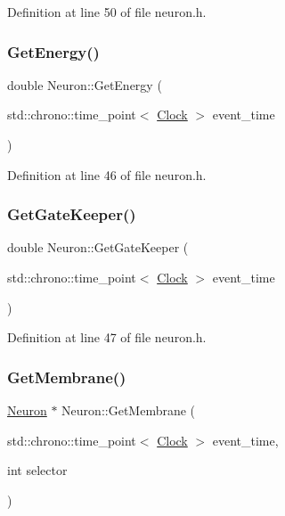Definition at line 50 of file neuron.\+h.

\mbox{\label{class_neuron_a91dd5325856e246d98c2864e1c955972}} 
\subsubsection{\texorpdfstring{Get\+Energy()}{GetEnergy()}}
{\footnotesize\ttfamily double Neuron\+::\+Get\+Energy (\begin{DoxyParamCaption}\item[{std\+::chrono\+::time\+\_\+point$<$ \hyperlink{universe_8h_a0ef8d951d1ca5ab3cfaf7ab4c7a6fd80}{Clock} $>$}]{event\+\_\+time }\end{DoxyParamCaption})\hspace{0.3cm}{\ttfamily [inline]}}



Definition at line 46 of file neuron.\+h.

\mbox{\label{class_neuron_a94accac3223afdecd1edf25e6db59ace}} 
\subsubsection{\texorpdfstring{Get\+Gate\+Keeper()}{GetGateKeeper()}}
{\footnotesize\ttfamily double Neuron\+::\+Get\+Gate\+Keeper (\begin{DoxyParamCaption}\item[{std\+::chrono\+::time\+\_\+point$<$ \hyperlink{universe_8h_a0ef8d951d1ca5ab3cfaf7ab4c7a6fd80}{Clock} $>$}]{event\+\_\+time }\end{DoxyParamCaption})\hspace{0.3cm}{\ttfamily [inline]}}



Definition at line 47 of file neuron.\+h.

\mbox{\label{class_neuron_a5bc4e67c5f2d8a3bcd160aa3f5086aec}} 
\subsubsection{\texorpdfstring{Get\+Membrane()}{GetMembrane()}}
{\footnotesize\ttfamily \hyperlink{class_neuron}{Neuron} $\ast$ Neuron\+::\+Get\+Membrane (\begin{DoxyParamCaption}\item[{std\+::chrono\+::time\+\_\+point$<$ \hyperlink{universe_8h_a0ef8d951d1ca5ab3cfaf7ab4c7a6fd80}{Clock} $>$}]{event\+\_\+time,  }\item[{int}]{selector }\end{DoxyParamCaption})}



